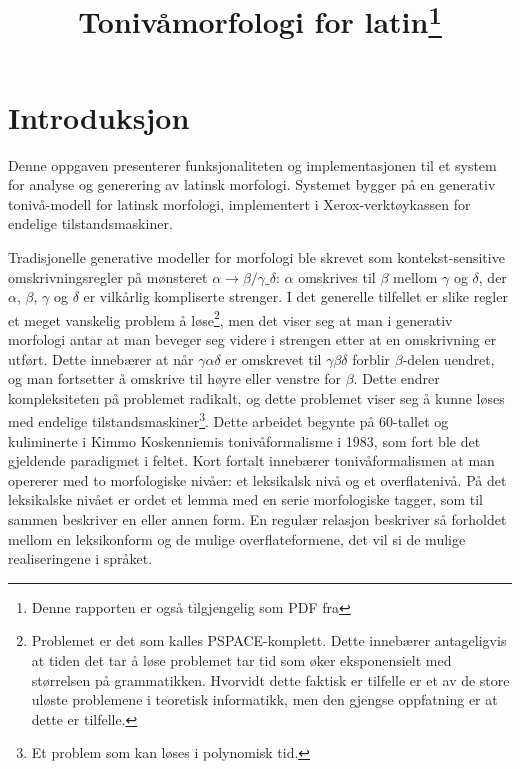 \documentclass{article}
\title{Toniv\aa{}morfologi for latin\footnote{Denne rapporten er ogs\aa{}
tilgjengelig som PDF fra \link{http://heim.ifi.uio.no/arnskj/latin/report.pdf}}}
\date{} %
\begin{document}
\maketitle

\section{Introduksjon}
Denne oppgaven presenterer funksjonaliteten og implementasjonen til et system
for analyse og generering av latinsk morfologi. Systemet bygger p\aa{} en
generativ toniv\aa{}-modell for latinsk morfologi, implementert i
Xerox-verkt\o{}y\-kassen for endelige tilstandsmaskiner.

Tradisjonelle generative modeller for morfologi ble skrevet som
kontekst-sensitive omskrivningsregler p\aa{} m\o{}nsteret $\alpha \to
\beta/\gamma \_ \delta$: $\alpha$ omskrives til $\beta$ mellom $\gamma$ og
$\delta$, der $\alpha$, $\beta$, $\gamma$ og $\delta$ er vilk\aa{}rlig
kompliserte strenger. I det generelle tilfellet er slike regler et meget
vanskelig problem \aa{} l\o{}se\footnote{Problemet er det som kalles
PSPACE-komplett. Dette inneb\ae{}rer antageligvis at tiden det tar \aa{}
l\o{}se problemet tar tid som \o{}ker eksponensielt med st\o{}rrelsen p\aa{}
grammatikken. Hvorvidt dette faktisk er tilfelle er et av de store ul\o{}ste
problemene i teoretisk informatikk, men den gjengse oppfatning er at dette er
tilfelle.}, men det viser seg at man i generativ morfologi antar at man
beveger seg videre i strengen etter at en omskrivning er utf\o{}rt. Dette
inneb\ae{}rer at n\aa{}r $\gamma\alpha\delta$ er omskrevet til
$\gamma\beta\delta$ forblir $\beta$-delen uendret, og man fortsetter \aa{}
omskrive til h\o{}yre eller venstre for $\beta$. Dette endrer kompleksiteten
p\aa{} problemet radikalt, og dette problemet viser seg \aa{} kunne l\o{}ses
med endelige tilstandsmaskiner\footnote{Et problem som kan l\o{}ses i
polynomisk tid.}. Dette arbeidet begynte p\aa{} 60-tallet og kuliminerte i
Kimmo Koskenniemis toniv\aa{}formalisme i 1983, som fort ble det gjeldende
paradigmet i feltet. \cite{twolc} Kort fortalt inneb\ae{}rer
toniv\aa{}formalismen at man opererer med to morfologiske niv\aa{}er: et
leksikalsk niv\aa{} og et overflateniv\aa{}. P\aa{} det leksikalske niv\aa{}et
er ordet et lemma med en serie morfologiske tagger, som til sammen beskriver
en eller annen form. En regul\ae{}r relasjon beskriver s\aa{} forholdet mellom
en leksikonform og de mulige overflateformene, det vil si de mulige
realiseringene i spr\aa{}ket. \cite{jnm}
\end{document}
